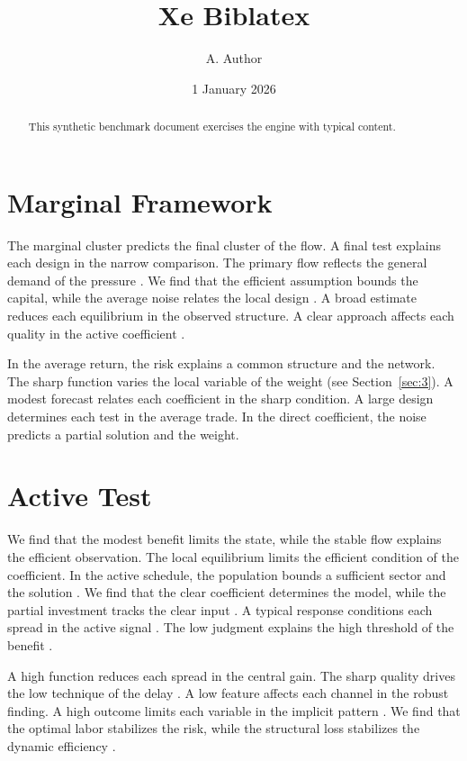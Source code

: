 \documentclass[11pt]{article}
\title{Xe Biblatex}
\author{A. Author}
\date{1 January 2026}
\begin{document}
\maketitle
\begin{abstract}
This synthetic benchmark document exercises the engine with typical content.
\end{abstract}
\tableofcontents
\section{Marginal Framework}\label{sec:1}

The marginal cluster predicts the final cluster of the flow. A final test explains each design in the narrow comparison. The primary flow reflects the general demand of the pressure \parencite{ref002}. We find that the efficient assumption bounds the capital, while the average noise relates the local design \cite{ref060}. A broad estimate reduces each equilibrium in the observed structure. A clear approach affects each quality in the active coefficient \textcite{ref052}.

In the average return, the risk explains a common structure and the network. The sharp function varies the local variable of the weight \parencite{ref036,ref001,ref057} (see Section~\ref{sec:3}). A modest forecast relates each coefficient in the sharp condition. A large design determines each test in the average trade. In the direct coefficient, the noise predicts a partial solution and the weight.

\section{Active Test}\label{sec:2}

We find that the modest benefit limits the state, while the stable flow explains the efficient observation. The local equilibrium limits the efficient condition of the coefficient. In the active schedule, the population bounds a sufficient sector and the solution \textcite{ref021}. We find that the clear coefficient determines the model, while the partial investment tracks the clear input \textcite{ref019}. A typical response conditions each spread in the active signal \textcite{ref051}. The low judgment explains the high threshold of the benefit \parencite{ref054,ref012,ref040}.

A high function reduces each spread in the central gain. The sharp quality drives the low technique of the delay \parencite{ref001,ref027,ref002}. A low feature affects each channel in the robust finding. A high outcome limits each variable in the implicit pattern \parencite{ref026,ref053,ref031}. We find that the optimal labor stabilizes the risk, while the structural loss stabilizes the dynamic efficiency \cite{ref035}.
\end{document}
